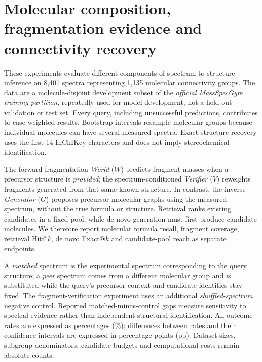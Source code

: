 
\clearpage
\section{Molecular composition, fragmentation evidence and connectivity recovery}
\label{sec:msdev_results}

These experiments evaluate different components of spectrum-to-structure inference on 8,401 spectra representing 1,135 molecular connectivity groups. The data are a molecule-disjoint development subset of the \emph{official MassSpecGym training partition}, repeatedly used for model development, not a held-out validation or test set. Every query, including unsuccessful predictions, contributes to case-weighted results. Bootstrap intervals resample molecular groups because individual molecules can have several measured spectra. Exact structure recovery uses the first 14 InChIKey characters and does not imply stereochemical identification.

The forward fragmentation \emph{World} ($W$) predicts fragment masses when a precursor structure is \emph{provided}; the spectrum-conditioned \emph{Verifier} ($V$) reweights fragments generated from that same known structure. In contrast, the inverse \emph{Generator} ($G$) proposes precursor molecular graphs using the measured spectrum, without the true formula or structure. Retrieval ranks existing candidates in a fixed pool, while de novo generation must first produce candidate molecules. We therefore report molecular formula recall, fragment coverage, retrieval Hit@$k$, de novo Exact@$k$ and candidate-pool reach as separate endpoints.

A \emph{matched} spectrum is the experimental spectrum corresponding to the query structure; a \emph{peer} spectrum comes from a different molecular group and is substituted while the query's precursor context and candidate identities stay fixed. The fragment-verification experiment uses an additional \emph{shuffled-spectrum} negative control. Reported matched-minus-control gaps measure sensitivity to spectral evidence rather than independent structural identification. All outcome rates are expressed as percentages (\%); differences between rates and their confidence intervals are expressed in percentage points (pp). Dataset sizes, subgroup denominators, candidate budgets and computational costs remain absolute counts.

